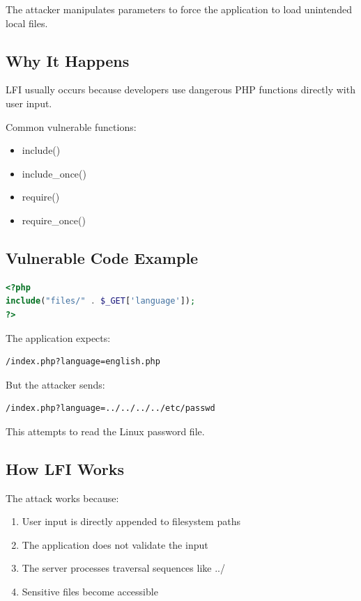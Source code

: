 \documentclass[12pt]{article}
\begin{document}
The attacker manipulates parameters to force the application to load unintended local files.

\subsection{Why It Happens}

LFI usually occurs because developers use dangerous PHP functions directly with user input.

Common vulnerable functions:

\begin{itemize}
    \item include()
    \item include\_once()
    \item require()
    \item require\_once()
\end{itemize}

\subsection{Vulnerable Code Example}

\begin{lstlisting}[language=PHP]
<?php
include("files/" . $_GET['language']);
?>
\end{lstlisting}

The application expects:

\begin{lstlisting}
/index.php?language=english.php
\end{lstlisting}

But the attacker sends:

\begin{lstlisting}
/index.php?language=../../../../etc/passwd
\end{lstlisting}

This attempts to read the Linux password file.

\subsection{How LFI Works}

The attack works because:

\begin{enumerate}
    \item User input is directly appended to filesystem paths
    \item The application does not validate the input
    \item The server processes traversal sequences like ../
    \item Sensitive files become accessible
\end{enumerate}
\end{document}
